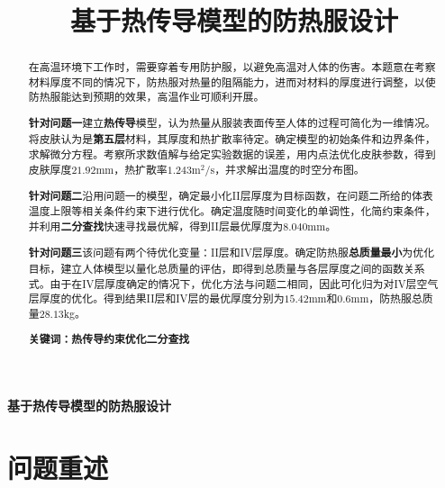 \documentclass{xcumcmart}
\title{基于热传导模型的防热服设计}
\begin{document}
\begin{minipage}{0.9\textwidth}
\centering\LARGE\textbf{基于热传导模型的防热服设计}
\end{minipage}

\par
\par\par
\renewcommand{\abstractname}{摘\quad 要} 
\begin{abstract}
在高温环境下工作时，需要穿着专用防护服，以避免高温对人体的伤害。本题意在考察材料厚度不同的情况下，防热服对热量的阻隔能力，进而对材料的厚度进行调整，以使防热服能达到预期的效果，高温作业可顺利开展。\par
\textbf{针对问题一}\quad 建立\textbf{热传导}模型，认为热量从服装表面传至人体的过程可简化为一维情况。将皮肤认为是\textbf{第五层}材料，其厚度和热扩散率待定。确定模型的初始条件和边界条件，求解微分方程。考察所求数值解与给定实验数据的误差，用内点法优化皮肤参数，得到皮肤厚度$21.92$mm，热扩散率$1.243\mathrm{m^2/s}$，并求解出温度的时空分布图。\par
\textbf{针对问题二}\quad 沿用问题一的模型，确定最小化II层厚度为目标函数，在问题二所给的体表温度上限等相关条件约束下进行优化。确定温度随时间变化的单调性，化简约束条件，并利用\textbf{二分查找}快速寻找最优解，得到II层最优厚度为$8.040$mm。\par
\textbf{针对问题三}\quad 该问题有两个待优化变量：II层和IV层厚度。确定防热服\textbf{总质量最小}为优化目标，建立人体模型以量化总质量的评估，即得到总质量与各层厚度之间的函数关系式。由于在IV层厚度确定的情况下，优化方法与问题二相同，因此可化归为对IV层空气层厚度的优化。得到结果II层和IV层的最优厚度分别为$15.42$mm和$0.6$mm，防热服总质量$28.13$kg。\par

\textbf{关键词：\quad 热传导\quad 约束优化\quad 二分查找}
\end{abstract}

\section{问题重述}
\end{document}
